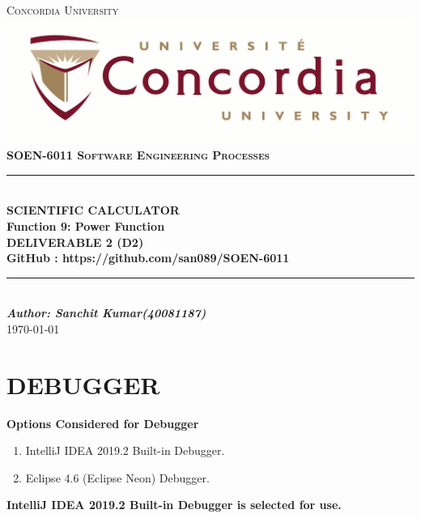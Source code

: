 \documentclass[a4paper,12pt]{article}
\newcommand{\Author}{Sanchit Kumar(40081187)}
\newcommand{\ProjectName}{Function 9: Power Function}
\newcommand{\Course}{\textbf{SOEN-6011 \vspace{0.5cm} Software Engineering Processes}}
\begin{document}

\begin{titlepage}
\newcommand{\HRule}{\rule{\linewidth}{0.5mm}} %


\centering
\textsc{\LARGE Concordia University} \\ [5mm] 
\includegraphics[scale=.1]{University_logo.jpg}\\[1cm] 
\textsc{\Large \Course} \\ [0.5cm]

	
\HRule \\[0.4cm]
{ \huge \bfseries SCIENTIFIC CALCULATOR \\ [5mm]  \ProjectName}\\[0.4cm] 
{\large \textbf{DELIVERABLE 2 (D2)} } \\ [0.2cm] 
{\large \textbf{GitHub : https://github.com/san089/SOEN-6011}}	
\HRule \\[1.5cm]


\vspace{5cm}
\Large \emph{\textbf{Author: \Author}}\\
{\large \today}\\[2cm]

\vfill
\end{titlepage}	



\newpage

\section{\large DEBUGGER}
\textbf{Options Considered for Debugger}
\begin{enumerate}
	\item IntelliJ IDEA 2019.2 Built-in Debugger.
	\item Eclipse 4.6 (Eclipse Neon) Debugger.
\end{enumerate} \vspace{0.5cm}
\textbf{IntelliJ IDEA 2019.2 Built-in Debugger is selected for use.}
\end{document}

